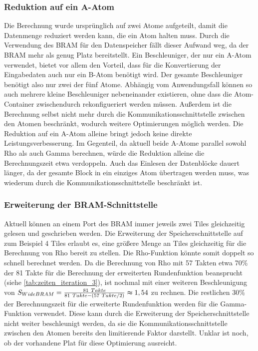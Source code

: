 \subsubsection{Reduktion auf ein A-Atom}
Die Berechnung wurde ursprünglich auf zwei Atome aufgeteilt, damit die Datenmenge reduziert werden kann, die ein Atom halten muss.
Durch die Verwendung des BRAM für den Datenspeicher fällt dieser Aufwand weg, da der BRAM mehr als genug Platz bereitstellt.
Ein Beschleuniger, der nur ein A-Atom verwendet, bietet vor allem den Vorteil, dass für die Konvertierung der Eingabedaten auch nur ein B-Atom benötigt wird.
Der gesamte Beschleuniger benötigt also nur zwei der fünf Atome. Abhängig vom Anwendungsfall können so auch mehrere kleine Beschleuniger nebeneinander existieren,
ohne dass die Atom-Container zwischendurch rekonfigueriert werden müssen.
Außerdem ist die Berechnung selbst nicht mehr durch die Kommunikationsschnittstelle zwischen den Atomen beschränkt, wodurch weitere Optimierungen möglich werden.
Die Reduktion auf ein A-Atom alleine bringt jedoch keine direkte Leistungsverbesserung. Im Gegenteil, da aktuell beide A-Atome parallel sowohl Rho als auch Gamma berechnen,
würde die Reduktion alleine die Berechnungszeit etwa verdoppeln. Auch das Einlesen der Datenblöcke dauert länger, da der gesamte Block in ein einziges Atom übertragen werden muss,
was wiederum durch die Kommunikationsschnittstelle beschränkt ist. 

\subsubsection{Erweiterung der BRAM-Schnittstelle}
Aktuell können an einem Port des BRAM immer jeweils zwei Tiles gleichzeitig gelesen und geschrieben werden.
Die Erweiterung der Speicherschnittstelle auf zum Beispiel 4 Tiles erlaubt es,
eine größere Menge an Tiles gleichzeitig für die Berechnung von Rho bereit zu stellen.
Die Rho-Funktion könnte somit doppelt so schnell berechnet werden. Da die Berechnung von Rho mit 57 Takten
etwa 70\% der 81 Takte für die Berechnung der erweiterten Rundenfunktion beansprucht (siehe \ref{tab:zeiten_iteration_3}),
ist nochmal mit einer weiteren Beschleunigung von $S_{WideBRAM} = \frac{81\ Takte}{81\ Takte - (57\ Takte / 2)} \thickapprox 1,54$ zu rechnen.
Die restlichen 30\% der Berechnungszeit für die erweiterte Rundenfunktion werden für die Gamma-Funktion verwendet.
Diese kann durch die Erweiterung der Speicherschnittstelle nicht weiter beschleunigt werden,
da sie die Kommunikationsschnittstelle zwischen den Atomen bereits den limitierende Faktor darstellt.
Unklar ist noch, ob der vorhandene Plat für diese Optimierung ausreicht.

